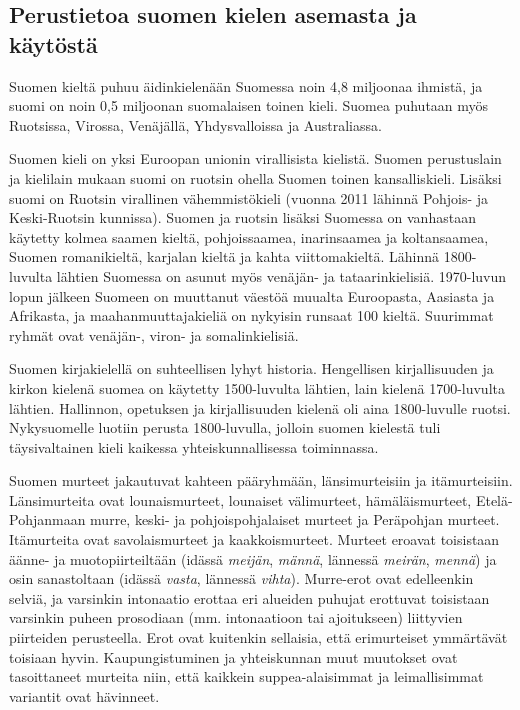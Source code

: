 \documentclass[]{../../metanetpaper}
\begin{document}
\begin{multicols}{2}
\subsection{Perustietoa suomen kielen asemasta ja käytöstä}



Suomen kieltä puhuu äidinkielenään Suomessa noin 4,8 miljoonaa ihmistä, ja
suomi on noin 0,5 miljoonan suomalaisen toinen kieli. Suomea puhutaan myös
Ruotsissa, Virossa, Venäjällä, Yhdysvalloissa ja Australiassa.

Suomen kieli on yksi Euroopan unionin virallisista kielistä. Suomen
perustuslain ja kielilain mukaan suomi on ruotsin ohella Suomen toinen
kansalliskieli. Lisäksi suomi on Ruotsin virallinen vähemmistökieli (vuonna
2011 lähinnä Pohjois- ja Keski-Ruotsin kunnissa). Suomen ja ruotsin lisäksi
Suomessa on vanhastaan käytetty kolmea saamen kieltä, pohjoissaamea,
inarinsaamea ja koltansaamea, Suomen romanikieltä, karjalan kieltä ja kahta
viittomakieltä. Lähinnä 1800-luvulta lähtien Suomessa on asunut myös venäjän-
ja tataarinkielisiä. 1970-luvun lopun jälkeen Suomeen on muuttanut väestöä
muualta Euroopasta, Aasiasta ja Afrikasta, ja maahanmuuttajakieliä on nykyisin
runsaat 100 kieltä. Suurimmat ryhmät ovat venäjän-, viron- ja somalinkielisiä.

Suomen kirjakielellä on suhteellisen lyhyt historia. Hengellisen kirjallisuuden
ja kirkon kielenä suomea on käytetty 1500-luvulta lähtien, lain kielenä
1700-luvulta lähtien. Hallinnon, opetuksen ja kirjallisuuden kielenä oli aina
1800-luvulle ruotsi. Nykysuomelle luotiin perusta 1800-luvulla, jolloin suomen
kielestä tuli täysivaltainen kieli kaikessa yhteiskunnallisessa toiminnassa.

Suomen murteet jakautuvat kahteen pääryhmään, länsimurteisiin ja itämurteisiin.
Länsimurteita ovat lounaismurteet, lounaiset välimurteet, hämäläismurteet,
Etelä-Pohjanmaan murre, keski- ja pohjoispohjalaiset murteet ja Peräpohjan
murteet. Itämurteita ovat savolaismurteet ja kaakkoismurteet. Murteet eroavat
toisistaan äänne- ja muotopiirteiltään (idässä \textit{meijän}, \textit{männä}, lännessä \textit{meirän},
\textit{mennä}) ja osin sanastoltaan (idässä \textit{vasta}, lännessä \textit{vihta}). Murre-erot ovat
edelleenkin selviä, ja varsinkin intonaatio erottaa eri alueiden puhujat
erottuvat toisistaan varsinkin puheen prosodiaan (mm. intonaatioon tai
ajoitukseen) liittyvien piirteiden perusteella. Erot ovat kuitenkin sellaisia,
että erimurteiset ymmärtävät toisiaan hyvin. Kaupungistuminen ja yhteiskunnan
muut muutokset ovat tasoittaneet murteita niin, että kaikkein suppea-alaisimmat
ja leimallisimmat variantit ovat hävinneet.



\end{multicols}
\end{document}
